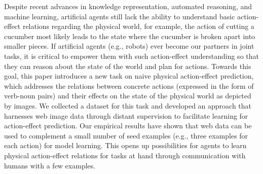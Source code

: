 Despite recent advances in knowledge representation, automated reasoning, and machine learning, artificial agents still lack the ability to understand basic action-effect relations regarding the physical world, for example, the action of cutting a cucumber most likely leads to the state where the cucumber is broken apart into smaller pieces. If artificial agents (e.g., robots) ever become our partners in joint tasks, it is critical to empower them with such action-effect understanding so that they can reason about the state of the world and plan for actions. Towards this goal, this paper introduces a new task on naive physical action-effect prediction, which addresses the relations between concrete actions (expressed in the form of verb-noun pairs) and their effects on the state of the physical world as depicted by images. We collected a dataset for this task and developed an approach that harnesses web image data through distant supervision to facilitate learning for action-effect prediction. Our empirical results have shown that web data can be used to complement a small number of seed examples (e.g., three examples for each action) for model learning. This opens up possibilities for agents to learn physical action-effect relations for tasks at hand through communication with humans with a few examples.
